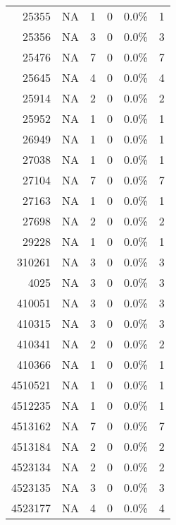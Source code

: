 \begin{longtable}{lrrrrr}
	\multicolumn{1}{r}{25355} & NA    & 1     & 0     & 0.0\% & 1 \\
	\multicolumn{1}{r}{25356} & NA    & 3     & 0     & 0.0\% & 3 \\
	\multicolumn{1}{r}{25476} & NA    & 7     & 0     & 0.0\% & 7 \\
	\multicolumn{1}{r}{25645} & NA    & 4     & 0     & 0.0\% & 4 \\
	\multicolumn{1}{r}{25914} & NA    & 2     & 0     & 0.0\% & 2 \\
	\multicolumn{1}{r}{25952} & NA    & 1     & 0     & 0.0\% & 1 \\
	\multicolumn{1}{r}{26949} & NA    & 1     & 0     & 0.0\% & 1 \\
	\multicolumn{1}{r}{27038} & NA    & 1     & 0     & 0.0\% & 1 \\
	\multicolumn{1}{r}{27104} & NA    & 7     & 0     & 0.0\% & 7 \\
	\multicolumn{1}{r}{27163} & NA    & 1     & 0     & 0.0\% & 1 \\
	\multicolumn{1}{r}{27698} & NA    & 2     & 0     & 0.0\% & 2 \\
	\multicolumn{1}{r}{29228} & NA    & 1     & 0     & 0.0\% & 1 \\
	\multicolumn{1}{r}{310261} & NA    & 3     & 0     & 0.0\% & 3 \\
	\multicolumn{1}{r}{4025} & NA    & 3     & 0     & 0.0\% & 3 \\
	\multicolumn{1}{r}{410051} & NA    & 3     & 0     & 0.0\% & 3 \\
	\multicolumn{1}{r}{410315} & NA    & 3     & 0     & 0.0\% & 3 \\
	\multicolumn{1}{r}{410341} & NA    & 2     & 0     & 0.0\% & 2 \\
	\multicolumn{1}{r}{410366} & NA    & 1     & 0     & 0.0\% & 1 \\
	\multicolumn{1}{r}{4510521} & NA    & 1     & 0     & 0.0\% & 1 \\
	\multicolumn{1}{r}{4512235} & NA    & 1     & 0     & 0.0\% & 1 \\
	\multicolumn{1}{r}{4513162} & NA    & 7     & 0     & 0.0\% & 7 \\
	\multicolumn{1}{r}{4513184} & NA    & 2     & 0     & 0.0\% & 2 \\
	\multicolumn{1}{r}{4523134} & NA    & 2     & 0     & 0.0\% & 2 \\
	\multicolumn{1}{r}{4523135} & NA    & 3     & 0     & 0.0\% & 3 \\
	\multicolumn{1}{r}{4523177} & NA    & 4     & 0     & 0.0\% & 4 \\

\end{longtable}

